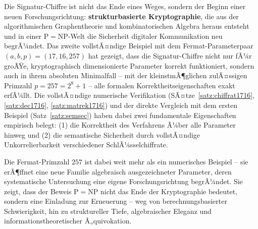 ﻿\documentclass[a4paper,12pt]{scrreprt}
\theoremstyle{definition}
\begin{document}
Die Signatur-Chiffre ist nicht das Ende eines Weges, sondern der Beginn einer neuen Forschungsrichtung: \textbf{strukturbasierte Kryptographie}, die aus der algorithmischen Graphentheorie und kombinatorischen Algebra heraus entsteht und in einer $\mathrm{P}=\mathrm{NP}$-Welt die Sicherheit digitaler Kommunikation neu begrÃ¼ndet. Das zweite vollstÃ¤ndige Beispiel mit dem Fermat-Parameterpaar $(a, b, p) = (17, 16, 257)$ hat gezeigt, dass die Signatur-Chiffre nicht nur fÃ¼r groÃŸe, kryptographisch dimensionierte Parameter korrekt funktioniert, sondern auch in ihrem absoluten Minimalfall -- mit der kleinstmÃ¶glichen zulÃ¤ssigen Primzahl $p = 257 = 2^8 + 1$ -- alle formalen Korrektheitseigenschaften exakt erfÃ¼llt. Die vollstÃ¤ndige numerische Verifikation (SÃ¤tze~\ref{satz:chiffrat1716}, \ref{satz:dec1716}, \ref{satz:matrek1716}) und der direkte Vergleich mit dem ersten Beispiel (Satz~\ref{satz:semsec}) haben dabei zwei fundamentale Eigenschaften empirisch belegt: (1) die Korrektheit des Verfahrens Ã¼ber alle Parameter hinweg und (2) die semantische Sicherheit durch vollstÃ¤ndige Unkorrelierbarkeit verschiedener SchlÃ¼sselchiffrate.

Die Fermat-Primzahl $257$ ist dabei weit mehr als ein numerisches Beispiel -- sie erÃ¶ffnet eine neue Familie algebraisch ausgezeichneter Parameter, deren systematische Untersuchung eine eigene Forschungsrichtung begrÃ¼ndet. Sie zeigt, dass der Beweis $\mathrm{P}=\mathrm{NP}$ nicht das Ende der Kryptographie bedeutet, sondern eine Einladung zur Erneuerung -- weg von berechnungsbasierter Schwierigkeit, hin zu struktureller Tiefe, algebraischer Eleganz und informationstheoretischer Ã„quivokation.
\end{document}
